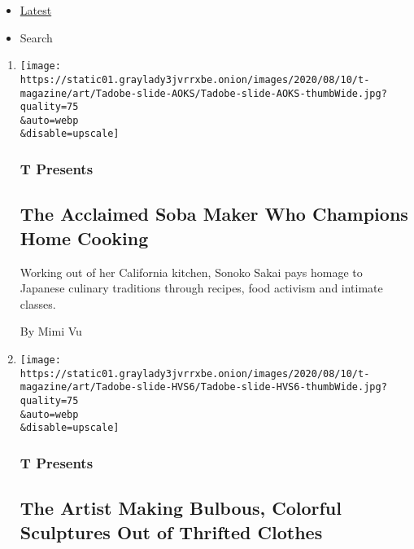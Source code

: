 \begin{itemize}
\tightlist
\item
  \protect\hyperlink{stream-panel}{Latest}
\item
  Search
\end{itemize}

\begin{enumerate}
\def\labelenumi{\arabic{enumi}.}
\item
  \href{/2020/08/10/t-magazine/sonoko-sakai-chef-cooking-soba.html}{}

  \texttt{[image: https://static01.graylady3jvrrxbe.onion/images/2020/08/10/t-magazine/art/Tadobe-slide-AOKS/Tadobe-slide-AOKS-thumbWide.jpg?quality=75\\\&auto=webp\\\&disable=upscale]}

  \hypertarget{t-presents}{%
  \subsubsection{T Presents}\label{t-presents}}

  \hypertarget{the-acclaimed-soba-maker-who-champions-home-cooking}{%
  \subsection{The Acclaimed Soba Maker Who Champions Home
  Cooking}\label{the-acclaimed-soba-maker-who-champions-home-cooking}}

  Working out of her California kitchen, Sonoko Sakai pays homage to
  Japanese culinary traditions through recipes, food activism and
  intimate classes.

  By Mimi Vu
\item
  \href{/2020/08/10/t-magazine/aiko-hachisuka-art-sculpture.html}{}

  \texttt{[image: https://static01.graylady3jvrrxbe.onion/images/2020/08/10/t-magazine/art/Tadobe-slide-HVS6/Tadobe-slide-HVS6-thumbWide.jpg?quality=75\\\&auto=webp\\\&disable=upscale]}

  \hypertarget{t-presents-1}{%
  \subsubsection{T Presents}\label{t-presents-1}}

  \hypertarget{the-artist-making-bulbous-colorful-sculptures-out-of-thrifted-clothes}{%
  \subsection{The Artist Making Bulbous, Colorful Sculptures Out of
  Thrifted
  Clothes}\label{the-artist-making-bulbous-colorful-sculptures-out-of-thrifted-clothes}}


\end{enumerate}
